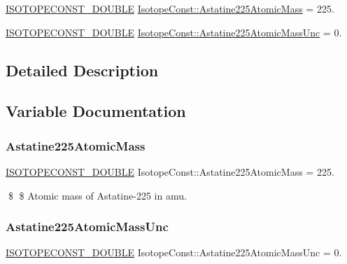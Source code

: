 \begin{DoxyCompactItemize}
\item 
\mbox{\hyperlink{group___isotope_const-_macros_ga8f45a7272ce02c0b4c65c44636ed719a}{I\+S\+O\+T\+O\+P\+E\+C\+O\+N\+S\+T\+\_\+\+D\+O\+U\+B\+LE}} \mbox{\hyperlink{group___isotope_const-_astatine-_at225_ga16c0e962d66580e62acf2fb232e9cd57}{Isotope\+Const\+::\+Astatine225\+Atomic\+Mass}} = 225.
\item 
\mbox{\hyperlink{group___isotope_const-_macros_ga8f45a7272ce02c0b4c65c44636ed719a}{I\+S\+O\+T\+O\+P\+E\+C\+O\+N\+S\+T\+\_\+\+D\+O\+U\+B\+LE}} \mbox{\hyperlink{group___isotope_const-_astatine-_at225_ga2e2e8311347d21591f9e103e32853266}{Isotope\+Const\+::\+Astatine225\+Atomic\+Mass\+Unc}} = 0.
\end{DoxyCompactItemize}


\subsection{Detailed Description}


\subsection{Variable Documentation}
\mbox{\label{group___isotope_const-_astatine-_at225_ga16c0e962d66580e62acf2fb232e9cd57}} 
\subsubsection{\texorpdfstring{Astatine225\+Atomic\+Mass}{Astatine225AtomicMass}}
{\footnotesize\ttfamily \mbox{\hyperlink{group___isotope_const-_macros_ga8f45a7272ce02c0b4c65c44636ed719a}{I\+S\+O\+T\+O\+P\+E\+C\+O\+N\+S\+T\+\_\+\+D\+O\+U\+B\+LE}} Isotope\+Const\+::\+Astatine225\+Atomic\+Mass = 225.}

\$ \$ Atomic mass of Astatine-\/225 in amu. \mbox{\label{group___isotope_const-_astatine-_at225_ga2e2e8311347d21591f9e103e32853266}} 
\subsubsection{\texorpdfstring{Astatine225\+Atomic\+Mass\+Unc}{Astatine225AtomicMassUnc}}
{\footnotesize\ttfamily \mbox{\hyperlink{group___isotope_const-_macros_ga8f45a7272ce02c0b4c65c44636ed719a}{I\+S\+O\+T\+O\+P\+E\+C\+O\+N\+S\+T\+\_\+\+D\+O\+U\+B\+LE}} Isotope\+Const\+::\+Astatine225\+Atomic\+Mass\+Unc = 0.}

